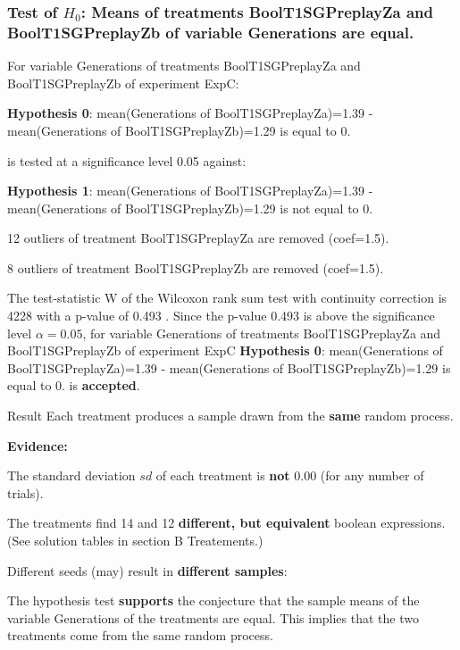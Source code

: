 \documentclass[18pt,c]{beamer}
\makeatletter
\let\beamer@writeslidentry@miniframeson=\beamer@writeslidentry
\newcommand*{\miniframeson}{\let\beamer@writeslidentry=\beamer@writeslidentry@miniframeson}
\makeatother
\begin{document}
\begin{frame}[t]
 \frametitle{Test of $H_{0}$: Means of treatments BoolT1SGPreplayZa and BoolT1SGPreplayZb of variable Generations are equal. }
 \scriptsize
 For variable Generations of treatments BoolT1SGPreplayZa and BoolT1SGPreplayZb of experiment ExpC:

\vspace{1mm}
{\bf Hypothesis 0}: mean(Generations of BoolT1SGPreplayZa)=1.39 - mean(Generations of BoolT1SGPreplayZb)=1.29 is equal to 0.


 \begin{center} is tested at a significance level 0.05 against: \end{center}

{\bf Hypothesis 1}: mean(Generations of BoolT1SGPreplayZa)=1.39 - mean(Generations of BoolT1SGPreplayZb)=1.29 is not equal to 0.
\vspace{1mm}
\vspace{1mm}

 12 outliers of treatment BoolT1SGPreplayZa are removed (coef=1.5).

 8 outliers of treatment BoolT1SGPreplayZb are removed (coef=1.5).
\vspace{1mm}
 
 The test-statistic W of the Wilcoxon rank sum test with continuity correction is 4228 with a p-value of 0.493 .
 Since the p-value 0.493 is above the significance level $\alpha= 0.05 $,
 for variable Generations of treatments BoolT1SGPreplayZa and BoolT1SGPreplayZb of experiment ExpC 
 {\bf Hypothesis 0}: mean(Generations of BoolT1SGPreplayZa)=1.39 - mean(Generations of BoolT1SGPreplayZb)=1.29 is equal to 0.
is {\bf accepted}.

 \end{frame}
\begin{frame}
\vspace*{2mm}
\begin{block}{
Result
}
Each treatment produces a sample drawn from the {\bf same} random process.
 
{\bf Evidence:}
 
The standard deviation $sd$ of each treatment is {\bf not} $0.00$
(for any number of trials).
 
The treatments find 14 and 12 {\bf different, but equivalent} boolean expressions.
(See solution tables in section B Treatements.)
 
Different seeds (may) result in {\bf different samples}:
 
The hypothesis test {\bf supports} the conjecture
that the sample means of the variable Generations of the treatments are equal.
This implies that the two treatments come from the same random process.
\end{block}
\end{frame}%
\miniframeson
\end{document}
